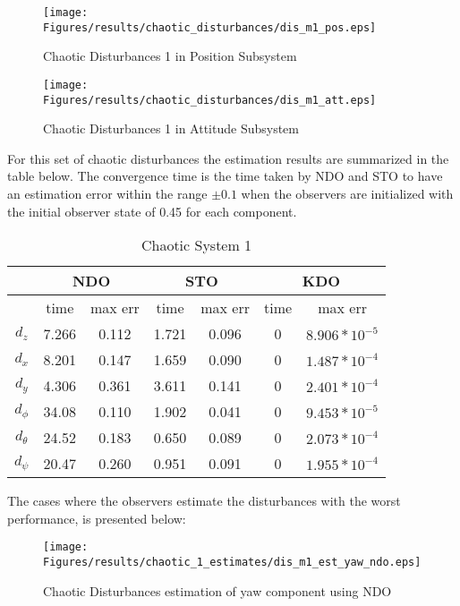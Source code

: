 \documentclass{article}
\begin{document}
\begin{figure}[H]
\centering
\texttt{[image: Figures/results/chaotic\_disturbances/dis\_m1\_pos.eps]}
\caption{Chaotic Disturbances 1 in Position Subsystem}
\label{dis_m1_pos}
\end{figure}

\begin{figure}[H]
\centering
\texttt{[image: Figures/results/chaotic\_disturbances/dis\_m1\_att.eps]}
\caption{Chaotic Disturbances 1 in Attitude Subsystem}
\label{dis_m1_att}
\end{figure}


For this set of chaotic disturbances the estimation results are summarized in the table below. The convergence time is the time taken by NDO and STO to have an estimation error within the range $\pm0.1$ when the observers are initialized with the initial observer state of 0.45 for each component. 



\begin{table}[!htbp]
\centering
\caption{Chaotic System 1}
\begin{tabular}{*7c}
\toprule
{}  &  \multicolumn{2}{c}{NDO} & \multicolumn{2}{c}{STO} & \multicolumn{2}{c}{KDO}\\
\midrule
{}        &   time & max err  & time  &max err& time  & max err\\
$d_z$     &  7.266 & 0.112   & 1.721  & 0.096 & 0     & $8.906*10^{-5}$\\
$d_x$     &  8.201 & 0.147   & 1.659  & 0.090 & 0     & $1.487*10^{-4}$\\
$d_y$     &  4.306 & 0.361   & 3.611  & 0.141 & 0     & $2.401*10^{-4}$\\
$d_\phi$  &  34.08 & 0.110   & 1.902  & 0.041 & 0     & $9.453*10^{-5}$\\
$d_\theta$&  24.52 & 0.183   & 0.650  & 0.089 & 0     & $2.073*10^{-4}$\\
$d_\psi$  &  20.47 & 0.260   & 0.951  & 0.091 & 0     & $1.955*10^{-4}$\\

\bottomrule
\end{tabular}
\end{table}

The cases where the observers estimate the disturbances with the worst performance, is presented below:

\begin{figure}[H]
\centering
\texttt{[image: Figures/results/chaotic\_1\_estimates/dis\_m1\_est\_yaw\_ndo.eps]}
\caption{Chaotic Disturbances estimation of yaw component using NDO}
\label{dis_m1_est_yaw_ndo}
\end{figure}
\end{document}
